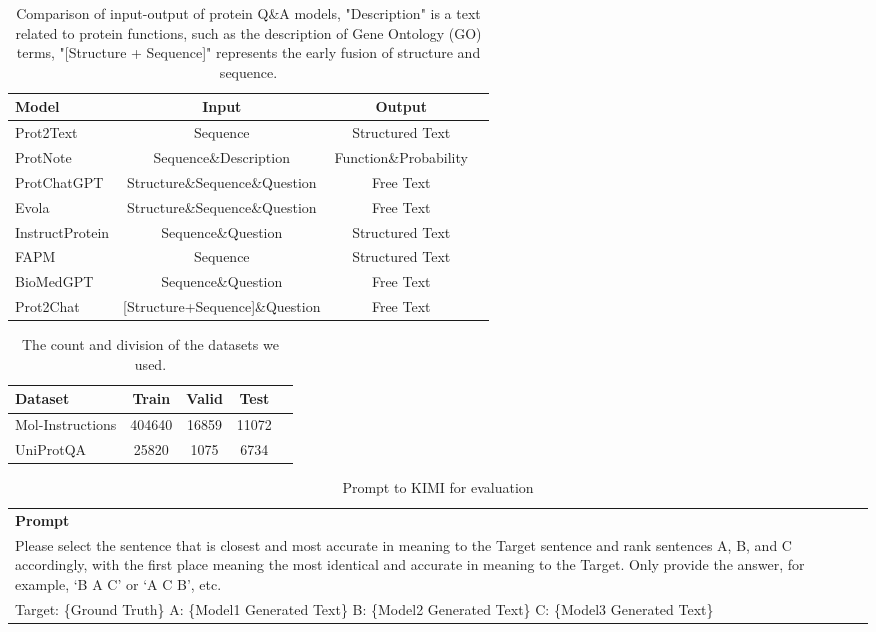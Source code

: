 \begin{table*}[ht]
    \centering
    \renewcommand{\arraystretch}{1.25}
    \begin{tabular}{l|ccr}
        \hline
        Model & Input & Output \\
        \hline
        Prot2Text & Sequence & Structured Text  \\
        ProtNote & Sequence\&Description & Function\&Probability    \\
        ProtChatGPT & Structure\&Sequence\&Question & Free Text  \\
        Evola & Structure\&Sequence\&Question & Free Text  \\
        InstructProtein & Sequence\&Question & Structured Text  \\
        FAPM & Sequence & Structured Text  \\
        BioMedGPT & Sequence\&Question & Free Text  \\
        Prot2Chat & [Structure+Sequence]\&Question & Free Text  \\
        \hline
    \end{tabular}
    \caption{Comparison of input-output of protein Q\&A models, "Description" is a text related to protein functions, such as the description of Gene Ontology (GO) terms, "[Structure + Sequence]" represents the early fusion of structure and sequence. }
    \label{tab:base models}
\end{table*}


\begin{table}[ht]
    \centering
    \renewcommand{\arraystretch}{1.25}
    \begin{tabular}{l|cccr }
        \hline
        Dataset & Train & Valid & Test\\
        \hline
        Mol-Instructions & 404640 & 16859 & 11072 \\
        UniProtQA & 25820 & 1075 & 6734  \\
        \hline
    \end{tabular}
    \caption{The count and division of the datasets we used.}
    \label{tab:dataset} 
\end{table}

\begin{table*}[ht]
    \centering
    \renewcommand{\arraystretch}{1.2}
    \begin{tabular}{p{}}
    \hline
    \textbf{Prompt} \\ 
    Please select the sentence that is closest and most accurate in meaning to the Target sentence and rank sentences A, B, and C accordingly, with the first place meaning the most identical and accurate in meaning to the Target. Only provide the answer, for example, `B A C' or `A C B', etc. \\
    Target: \{Ground Truth\} A: \{Model1 Generated Text\} B: \{Model2 Generated Text\} C: \{Model3 Generated Text\} \\ \hline
    \end{tabular}
    \caption{Prompt to KIMI for evaluation}
    \label{tab:prompt}
\end{table*}



